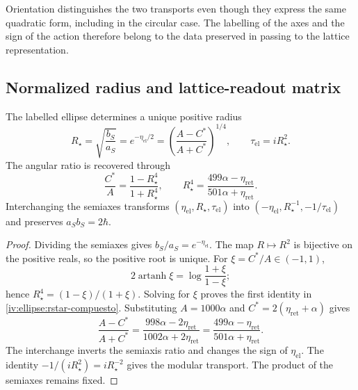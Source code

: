 Orientation distinguishes the two transports even though they express
the same quadratic form, including in the circular case.
The labelling of the axes and the sign of the action therefore belong
to the data preserved in passing to the
lattice representation.

\subsection{Normalized radius and lattice-readout matrix}
\label{iv:ellipse:radio}

\begin{proposition}
\label{iv:ellipse:radio-prop}
The labelled ellipse determines a unique positive radius
\begin{equation}
 R_\star=\sqrt{\frac{b_S}{a_S}}
 =e^{-\eta_{\mathrm{el}}/2}
 =\left(\frac{A-C^*}{A+C^*}\right)^{1/4},
 \qquad \tau_{\mathrm{el}}=iR_\star^2.
 \label{iv:ellipse:rstar}
\end{equation}
The angular ratio is recovered through
\begin{equation}
 \frac{C^*}{A}=\frac{1-R_\star^4}{1+R_\star^4},
 \qquad
 R_\star^4=
 \frac{499\alpha-\eta_{\mathrm{ret}}}
      {501\alpha+\eta_{\mathrm{ret}}}.
 \label{iv:ellipse:rstar-compuesto}
\end{equation}
Interchanging the semiaxes transforms
\((\eta_{\mathrm{el}},R_\star,\tau_{\mathrm{el}})\) into
\((-\eta_{\mathrm{el}},R_\star^{-1},-1/\tau_{\mathrm{el}})\)
and preserves \(a_Sb_S=2\hbar\).
\end{proposition}
\begin{proof}
Dividing the semiaxes gives \(b_S/a_S=e^{-\eta_{\mathrm{el}}}\).
The map \(R\mapsto R^2\) is bijective on the positive
reals, so the positive root is unique.
For \(\xi=C^*/A\in(-1,1)\),
\[
 2\operatorname{artanh}\xi
 =\log\frac{1+\xi}{1-\xi};
\]
hence \(R_\star^4=(1-\xi)/(1+\xi)\).
Solving for \(\xi\) proves the first identity in
\eqref{iv:ellipse:rstar-compuesto}. Substituting
\(A=1000\alpha\) and
\(C^*=2(\eta_{\mathrm{ret}}+\alpha)\) gives
\[
 \frac{A-C^*}{A+C^*}
 =\frac{998\alpha-2\eta_{\mathrm{ret}}}
        {1002\alpha+2\eta_{\mathrm{ret}}}
 =\frac{499\alpha-\eta_{\mathrm{ret}}}
        {501\alpha+\eta_{\mathrm{ret}}}.
\]
The interchange inverts the semiaxis ratio and changes the
sign of \(\eta_{\mathrm{el}}\). The identity
\(-1/(iR_\star^2)=iR_\star^{-2}\) gives the modular
transport. The product of the semiaxes remains fixed.
\end{proof}

